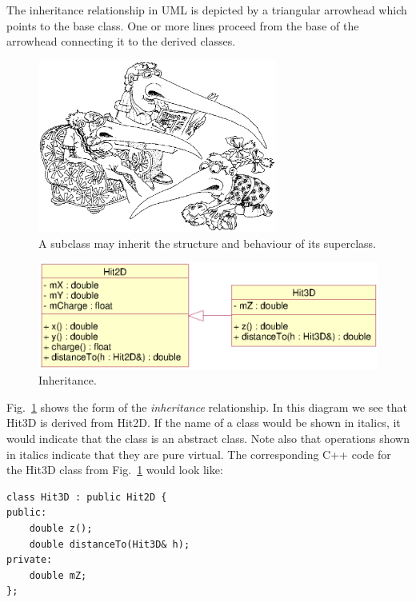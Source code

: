 \documentclass[twoside]{article}
\begin{document}
The inheritance relationship in UML is depicted by a triangular
arrowhead which points to the base class. One or more lines proceed
from the base of the arrowhead connecting it to the derived classes.
\begin{figure}[htb]
    \begin{center}
        \includegraphics[width=0.7\textwidth]{cartoon6.eps}
        \caption{A subclass may inherit the structure and behaviour
            of its superclass.}
    \end{center}
\end{figure}
\begin{figure}[htb]
    \begin{center}
        \includegraphics{umlInheritance.eps}
        \caption{Inheritance.}
        \label{fig:umlInheritance}
    \end{center}
\end{figure}

Fig.~\ref{fig:umlInheritance} shows the form of the \emph{inheritance}
relationship.  In this diagram we see that Hit3D is derived from
Hit2D.  If the name of a class would be shown in italics, it would
indicate that the class is an abstract class.  Note also that
operations shown in italics indicate that they are pure virtual.  The
corresponding C++ code for the Hit3D class from
Fig.~\ref{fig:umlInheritance} would look like:

{\footnotesize
\begin{verbatim}
class Hit3D : public Hit2D {
public:
    double z();
    double distanceTo(Hit3D& h);
private:
    double mZ;
};
\end{verbatim}
}%
\end{document}
